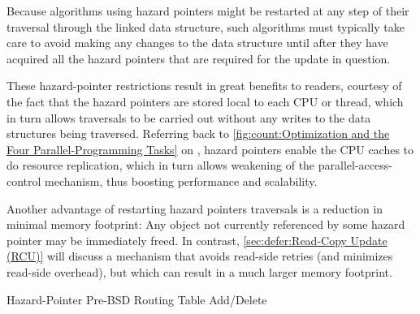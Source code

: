 \QuickQuizEnd

Because algorithms using hazard pointers might be restarted at any
step of their traversal through the linked data structure, such algorithms
must typically take care to avoid making any changes to the data
structure until after they have acquired all the hazard pointers that
are required for the update in question.

\QuickQuizEnd

These hazard-pointer restrictions result in great benefits to readers,
courtesy of the fact that the hazard pointers are stored local to each
CPU or thread, which in turn allows traversals to be carried out without
any writes to the data structures being traversed.
Referring back to
\cref{fig:count:Optimization and the Four Parallel-Programming Tasks}
on
,
hazard pointers enable the CPU caches to do resource replication, which
in turn allows weakening of the parallel-access-control mechanism,
thus boosting performance and scalability.

Another advantage of restarting hazard pointers traversals is a reduction in
minimal memory footprint:
Any object not currently referenced by some hazard pointer may be
immediately freed.
In contrast,
\cref{sec:defer:Read-Copy Update (RCU)}
will discuss a mechanism that avoids read-side retries (and minimizes
read-side overhead), but which can result in a much larger memory
footprint.

\begin{listing}

\caption{Hazard-Pointer Pre-BSD Routing Table Add\slash Delete}
\label{lst:defer:Hazard-Pointer Pre-BSD Routing Table Add/Delete}
\end{listing}

